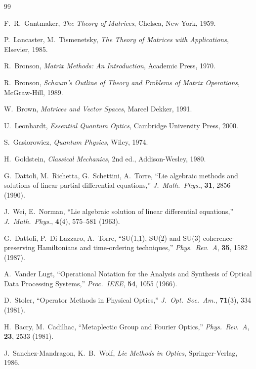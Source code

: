 \begin{thebibliography}{99}

F.~R.\ Gantmaker, \emph{The Theory of Matrices}, Chelsea, New York, 1959.

P.~Lancaster, M.~Tismenetsky, \emph{The Theory of Matrices with Applications}, Elsevier, 1985.

R.~Bronson, \emph{Matrix Methods: An Introduction}, Academic Press, 1970.

R.~Bronson, \emph{Schaum's Outline of Theory and Problems of Matrix Operations}, McGraw-Hill, 1989.

W.~Brown, \emph{Matrices and Vector Spaces}, Marcel Dekker, 1991.

U.~Leonhardt, \emph{Essential Quantum Optics}, Cambridge University Press, 2000.

S.~Gasiorowicz, \emph{Quantum Physics}, Wiley, 1974.

H.~Goldstein, \emph{Classical Mechanics}, 2nd ed., Addison-Wesley, 1980.

G.~Dattoli, M.~Richetta, G.~Schettini, A.~Torre,
``Lie algebraic methods and solutions of linear partial differential equations,''
\emph{J.\ Math.\ Phys.}, \textbf{31}, 2856 (1990).

J.~Wei, E.~Norman,
``Lie algebraic solution of linear differential equations,''
\emph{J.\ Math.\ Phys.}, \textbf{4}(4), 575--581 (1963).

G.~Dattoli, P.~Di Lazzaro, A.~Torre,
``SU(1,1), SU(2) and SU(3) coherence-preserving Hamiltonians and time-ordering techniques,''
\emph{Phys.\ Rev.\ A}, \textbf{35}, 1582 (1987).

A.~Vander Lugt,
``Operational Notation for the Analysis and Synthesis of Optical Data Processing Systems,''
\emph{Proc.\ IEEE}, \textbf{54}, 1055 (1966).

D.~Stoler,
``Operator Methods in Physical Optics,''
\emph{J.\ Opt.\ Soc.\ Am.}, \textbf{71}(3), 334 (1981).

H.~Bacry, M.~Cadilhac,
``Metaplectic Group and Fourier Optics,''
\emph{Phys.\ Rev.\ A}, \textbf{23}, 2533 (1981).

J.~Sanchez-Mandragon, K.~B.~Wolf,
\emph{Lie Methods in Optics}, Springer-Verlag, 1986.


\end{thebibliography}
